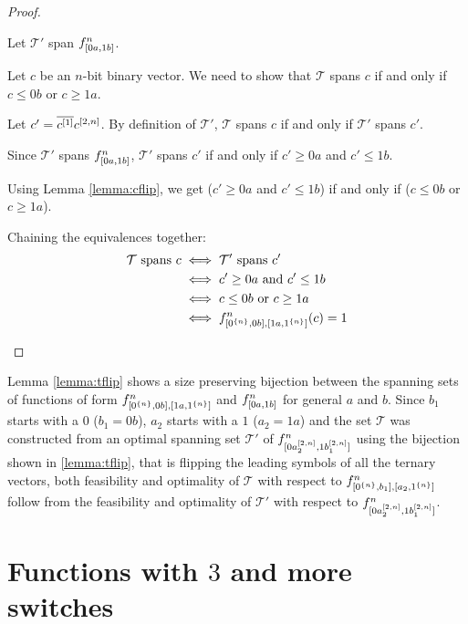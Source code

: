 \begin{proof}
\begin{enumerate}
Let $\mathcal{T}'$ span $f^{n}_{[0 a, 1 b]}$.

Let $c$ be an $n$-bit binary vector.
We need to show that $\mathcal{T}$ spans $c$
if and only if
$c \leq 0 b$ or $c \geq 1 a$.

Let $c' = \overline{c^{[1]}} c^{[2, n]}$.
By definition of $\mathcal{T}'$,
$\mathcal{T}$ spans $c$
if and only if
$\mathcal{T}'$ spans $c'$.

Since $\mathcal{T}'$ spans $f^{n}_{[0 a, 1 b]}$,
$\mathcal{T}'$ spans $c'$
if and only if
$c' \geq 0 a$ and $c' \leq 1 b$.

Using Lemma \ref{lemma:cflip},
we get
($c' \geq 0 a$ and $c' \leq 1 b$)
if and only if
($c \leq 0 b$ or $c \geq 1 a$).

Chaining the equivalences together:
\begin{align*}
\mathcal{T} \text{ spans } c
&\iff \mathcal{T}' \text{ spans } c' \\
&\iff c' \geq 0 a \text{ and } c' \leq 1 b \\
&\iff c \leq 0 b \text{ or } c \geq 1 a \\
&\iff f^{n}_{[0^{\{n\}}, 0 b], [1 a, 1^{\{n\}}]}(c) = 1
\end{align*}

\end{enumerate}
\end{proof}

Lemma \ref{lemma:tflip} shows
a size preserving
bijection
between
the spanning sets of functions of form
$f^{n}_{[0^{\{n\}}, 0 b], [1 a, 1^{\{n\}}]}$
and $f^{n}_{[0 a, 1 b]}$
for general $a$ and $b$.
Since $b_1$ starts with a $0$ ($b_1 = 0 b$),
$a_2$ starts with a $1$ ($a_2 = 1 a$)
and the set $\mathcal{T}$ was constructed
from an optimal spanning set $\mathcal{T}'$
of
$f^{n}_{[0 a_2^{[2, n]}, 1 b_1^{[2, n]}]}$
using the bijection
shown in \ref{lemma:tflip},
that is flipping the leading symbols
of all the ternary vectors,
both feasibility and optimality of $\mathcal{T}$
with respect to $f^{n}_{[0^{\{n\}}, b_1], [a_2, 1^{\{n\}}]}$
follow from the feasibility and optimality
of $\mathcal{T}'$ with respect to
$f^{n}_{[0 a_2^{[2, n]}, 1 b_1^{[2, n]}]}$.

\section{Functions with \texorpdfstring{$3$}{3}
and more switches}
\label{sec:3switch}

